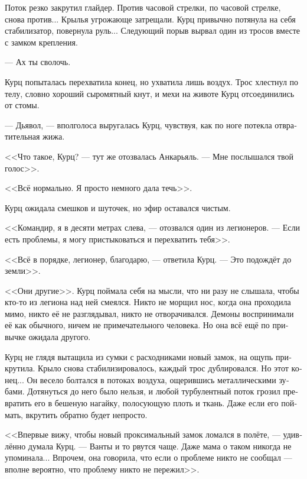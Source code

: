 \documentclass[a4paper,12pt,fleqn]{book}\usepackage{polyglossia}\setdefaultlanguage[babelshorthands=true]{russian}\setotherlanguage{english}\defaultfontfeatures{Ligatures=TeX,Mapping=tex-text}\usepackage{xcolor}\newcommand{\ml}[3]{#2}
\begin{document}
Поток резко закрутил глайдер.
Против часовой стрелки, по часовой стрелке, снова против...
Крылья угрожающе затрещали.
Курц привычно потянула на себя стабилизатор, повернула руль...
Следующий порыв вырвал один из тросов вместе с замком крепления.

--- Ах ты сволочь.

Курц попыталась перехватила конец, но ухватила лишь воздух.
Трос хлестнул по телу, словно хороший сыромятный кнут, и мехи на животе Курц отсоединились от стомы.

--- Дьявол, --- вполголоса выругалась Курц, чувствуя, как по ноге потекла отвратительная жижа.

\ml{$0$}
{<<Что такое, Курц? --- тут же отозвалась Анкарьяль.}
{``Whazzup, Kurz?'' Angaralle immediately answered.}
\ml{$0$}
{--- Мне послышался твой голос>>.}
{``I thought I heard your voice.''}

\ml{$0$}
{<<Всё нормально.}
{``I'm all right.}
\ml{$0$}
{Я просто немного дала течь>>.}
{Just sprung a leak.''}

Курц ожидала смешков и шуточек, но эфир оставался чистым.

<<Командир, я в десяти метрах слева, --- отозвался один из легионеров.
--- Если есть проблемы, я могу пристыковаться и перехватить тебя>>.

<<Всё в порядке, легионер, благодарю, --- ответила Курц.
--- Это подождёт до земли>>.

\ml{$0$}
{<<Они другие>>.}
{They're different.}
Курц поймала себя на мысли, что ни разу не слышала, чтобы кто-то из легиона над ней смеялся.
Никто не морщил нос, когда она проходила мимо, никто её не разглядывал, никто не отворачивался.
Демоны воспринимали её как обычного, ничем не примечательного человека.
Но она всё ещё по привычке ожидала другого.

Курц не глядя вытащила из сумки с расходниками новый замок, на ощупь прикрутила.
Крыло снова стабилизировалось, каждый трос дублировался.
Но этот конец...
Он весело болтался в потоках воздуха, ощерившись металлическими зубами.
Дотянуться до него было нельзя, и любой турбулентный поток грозил превратить его в бешеную нагайку, полосующую плоть и ткань.
Даже если его поймать, вкрутить обратно будет непросто.

<<Впервые вижу, чтобы новый проксимальный замок ломался в полёте, --- удивлённо думала Курц.
--- Ванты и то рвутся чаще.
Даже мама о таком никогда не упоминала...
\ml{$0$}
{Впрочем, она говорила, что если о проблеме никто не сообщал --- вполне вероятно, что проблему никто не пережил>>.}
{\textit{She told, however, if the problem were not reported, the problem more than likely were not outlived.}}
\end{document}
